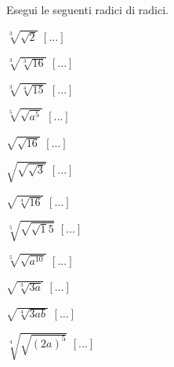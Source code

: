 \begin{esercizio}[\Ast]
\begin{multicols}{3}
\begin{enumeratea}
 \end{enumeratea}
 \end{multicols}
\end{esercizio}

\begin{esercizio}[\Ast]
 \label{ese:2.48}
Esegui le seguenti radici di radici.
 \begin{multicols}{4}
 \begin{enumeratea}
 \item $\sqrt[3]{\sqrt 2}$
  \hfill $\left[...\right]$
 \item $\sqrt[3]{\sqrt[3]{16}}$
  \hfill $\left[...\right]$
 \item $\sqrt[3]{\sqrt[4]{15}}$
  \hfill $\left[...\right]$
 \item $\sqrt[5]{\sqrt{a^5}}$
  \hfill $\left[...\right]$
 \item $\sqrt{\sqrt{16}}$
  \hfill $\left[...\right]$
 \item $\sqrt{\sqrt{\sqrt 3}}$
  \hfill $\left[...\right]$
 \item $\sqrt{\sqrt[4]{16}}$
  \hfill $\left[...\right]$
 \item $\sqrt[5]{\sqrt{\sqrt 15}}$
  \hfill $\left[...\right]$
 \item $\sqrt[5]{\sqrt{a^{10}}}$
  \hfill $\left[...\right]$
 \item $\sqrt{\sqrt[3]{3a}}$
  \hfill $\left[...\right]$
 \item $\sqrt{\sqrt[4]{3ab}}$
  \hfill $\left[...\right]$
 \item $\sqrt[4]{\sqrt{(2a)^5}}$
  \hfill $\left[...\right]$
 \end{enumeratea}
 \end{multicols}
\end{esercizio}

